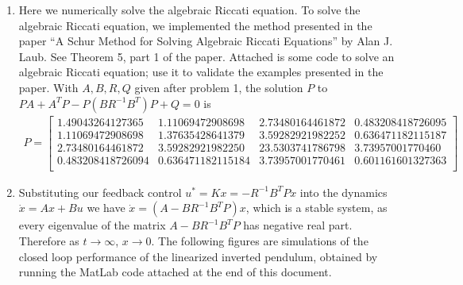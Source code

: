 \documentclass[10pt]{article}
\newcommand{\mat}[2][ccccccccccccccc]{\left [\!\!\begin{array}{#1} #2\\ \end{array} \!\!\right]}
\newcommand{\inv}{^{-1}}
\begin{document}
\begin{enumerate}[leftmargin=*]
   \item Here we numerically solve the algebraic Riccati equation.  To solve the algebraic Riccati equation, we implemented the method presented in the paper ``A Schur Method for Solving Algebraic Riccati Equations'' by Alan J. Laub.  See Theorem 5, part 1 of the paper.  Attached is some code to solve an algebraic Riccati equation; use it to validate the examples presented in the paper.  With $A,B,R, Q$ given after problem 1, the solution $P$ to $PA+A^TP-P(BR\inv B^T)P+Q=0$ is
       \begin{align*}
       P=\mat{
            1.49043264127365 &	1.11069472908698 &	2.73480164461872 &	0.483208418726095 \\
            1.11069472908698 &	1.37635428641379 &	3.59282921982252 &	0.636471182115187 \\
            2.73480164461872 &	3.59282921982250 &	23.5303741786798 &	3.73957001770460 \\
            0.483208418726094 &	0.636471182115184 &	3.73957001770461 &	0.601161601327363
            }
       \end{align*}

    \item Substituting our feedback control $u^*=Kx=-R\inv B^TPx$ into the dynamics $\dot x = Ax+Bu$ we have $\dot x = (A-BR\inv B^TP)x$, which is a stable system, as every eigenvalue of the matrix $A-BR\inv B^TP$ has negative real part.  Therefore as $t\longrightarrow\infty$, $x\longrightarrow0$.  The following figures are simulations of the closed loop performance of the linearized inverted pendulum, obtained by running the MatLab code attached at the end of this document.


\end{enumerate}
\end{document}
